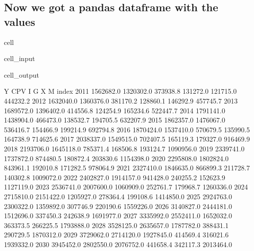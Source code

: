 \documentclass[letterpaper,10pt,english]{jupyterBook}
\begin{document}
\subsection{Now we got a pandas dataframe with the values}
\label{\detokenize{content/howto/smallmodel/modelstart:now-we-got-a-pandas-dataframe-with-the-values}}
\begin{sphinxuseclass}{cell}\begin{sphinxVerbatimInput}

\begin{sphinxuseclass}{cell_input}
\begin{sphinxVerbatim}[commandchars=\\\{\}]
\end{sphinxVerbatim}

\end{sphinxuseclass}\end{sphinxVerbatimInput}
\begin{sphinxVerbatimOutput}

\begin{sphinxuseclass}{cell_output}
\begin{sphinxVerbatim}[commandchars=\\\{\}]
               Y        CPV          I         G         X          M  \PYGZbs{}
index                                                                   
2011   1562682.0  1320302.0   373938.8  131272.0  121715.0   444232.2   
2012   1632040.0  1360376.0   381170.2  128860.1  146292.9   457745.7   
2013   1689572.0  1396402.0   414556.8  124254.9  165234.6   522447.7   
2014   1791141.0  1438904.0   466473.0  138532.7  194705.5   632207.9   
2015   1862357.0  1476067.0   536416.7  154466.9  199214.9   692794.8   
2016   1870424.0  1537410.0   570679.5  135990.5  164738.9   714625.6   
2017   2038337.0  1549515.0   702407.5  165119.3  179327.0   916469.9   
2018   2193706.0  1645118.0   785371.4  168506.8  193124.7  1090956.0   
2019   2339741.0  1737872.0   874480.5  180872.4  203830.6  1154398.0   
2020   2295808.0  1802824.0   843961.1  192010.8  171282.5   978064.9   
2021   2327410.0  1846635.0   866899.3  211728.7  140302.8  1009072.0   
2022   2402827.0  1914157.0   941428.0  240255.2  152623.9  1127119.0   
2023   2536741.0  2007600.0  1060909.0  252761.7  179968.7  1260336.0   
2024   2715810.0  2151422.0  1205927.0  278364.4  199108.6  1414850.0   
2025   2924763.0  2300322.0  1359892.0  307746.9  220190.6  1559226.0   
2026   3140827.0  2444181.0  1512696.0  337450.3  242638.9  1691977.0   
2027   3335992.0  2552411.0  1652032.0  363373.5  266225.5  1793888.0   
2028   3528125.0  2635657.0  1787782.0  388431.1  290729.5  1870312.0   
2029   3729062.0  2714120.0  1927845.0  414569.4  316021.6  1939332.0   
2030   3945452.0  2802550.0  2076752.0  441658.4  342117.3  2013464.0   


\end{sphinxVerbatim}
\end{sphinxuseclass}
\end{sphinxVerbatimOutput}
\end{sphinxuseclass}
\end{document}
